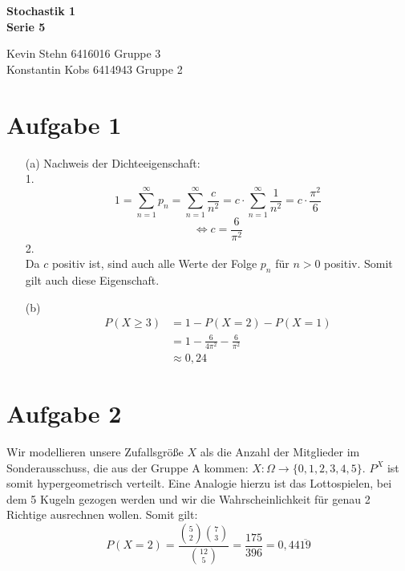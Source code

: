 \documentclass[10pt,a4paper]{article}
\begin{document}
\begin{center}
\textbf{Stochastik 1 \\ Serie 5 \\}
\end{center}

\begin{flushright}
Kevin Stehn 6416016 Gruppe 3 \\
Konstantin Kobs 6414943 Gruppe 2
\end{flushright}

\section*{Aufgabe 1}
\begin{itemize}
\item[(a)]Nachweis der Dichteeigenschaft:\\
1.
$$1 = \sum_{n=1}^\infty p_n = \sum_{n=1}^\infty \frac{c}{n^2} = c \cdot \sum_{n=1}^\infty \frac{1}{n^2} = c \cdot \frac{\pi^2}{6}$$
$$\Leftrightarrow c = \frac{6}{\pi^2}$$
2.\\
Da $c$ positiv ist, sind auch alle Werte der Folge $p_n$ für $n > 0$ positiv. Somit gilt auch diese Eigenschaft.
\item[(b)]
\begin{align*}
P(X \geq 3) &= 1 - P(X = 2) - P(X = 1)\\
&= 1 - \frac{6}{4\pi^2} - \frac{6}{\pi^2}\\
&\approx 0,24
\end{align*}
\end{itemize}

\section*{Aufgabe 2}
Wir modellieren unsere Zufallsgröße $X$ als die Anzahl der Mitglieder im Sonderausschuss, die aus der Gruppe A kommen: $X : \Omega \rightarrow \{0,1,2,3,4,5\}$. $P^X$ ist somit hypergeometrisch verteilt. Eine Analogie hierzu ist das Lottospielen, bei dem 5 Kugeln gezogen werden und wir die Wahrscheinlichkeit für genau 2 Richtige ausrechnen wollen. Somit gilt:
$$P(X = 2) = \frac{\binom{5}{2} \binom{7}{3}}{\binom{12}{5}} = \frac{175}{396} = 0,44\overline{19}$$
\end{document}

